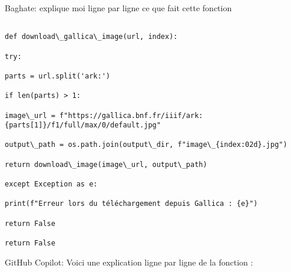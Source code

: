 Baghate: explique moi ligne par ligne ce que fait cette fonction

\begin{verbatim}

def download\_gallica\_image(url, index):

try:

parts = url.split('ark:')

if len(parts) > 1:

image\_url = f"https://gallica.bnf.fr/iiif/ark:{parts[1]}/f1/full/max/0/default.jpg"

output\_path = os.path.join(output\_dir, f"image\_{index:02d}.jpg")

return download\_image(image\_url, output\_path)

except Exception as e:

print(f"Erreur lors du téléchargement depuis Gallica : {e}")

return False

return False

\end{verbatim}

GitHub Copilot: Voici une explication ligne par ligne de la fonction :

